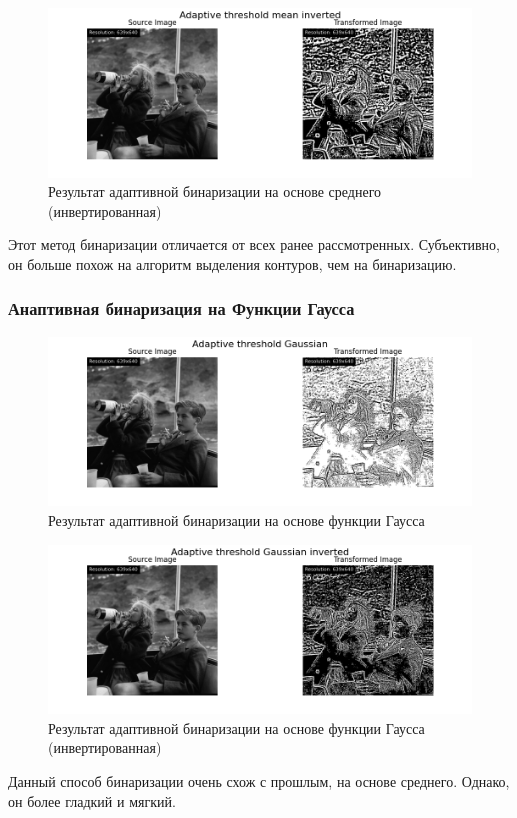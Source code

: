 \begin{figure}[ht!]
    \centering
    \includegraphics[width=\textwidth]{../results/Adaptive threshold mean inverted.png}
    \caption{Результат адаптивной бинаризации на основе среднего (инвертированная)}
    \label{img:adaptive_mean_inv}
\end{figure}

Этот метод бинаризации отличается от всех ранее рассмотренных. Субъективно, он больше похож на алгоритм выделения контуров, чем на бинаризацию. 
\FloatBarrier
\subsubsection{Анаптивная бинаризация на Функции Гаусса}

\begin{figure}[ht!]
    \centering
    \includegraphics[width=\textwidth]{../results/Adaptive threshold Gaussian.png}
    \caption{Результат адаптивной бинаризации на основе функции Гаусса}
    \label{img:adaptive_gaussian}
\end{figure}

\FloatBarrier
\begin{figure}[ht!]
    \centering
    \includegraphics[width=\textwidth]{../results/Adaptive threshold Gaussian inverted.png}
    \caption{Результат адаптивной бинаризации на основе функции Гаусса (инвертированная)}
    \label{img:adaptive_gaussian_inv}
\end{figure}

Данный способ бинаризации очень схож с прошлым, на основе среднего. Однако, он более гладкий и мягкий.

